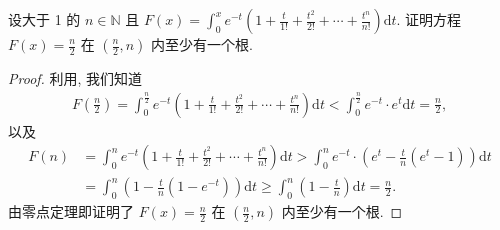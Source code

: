 \documentclass[../../main.tex]{subfiles}%
\begin{document}
\begin{example}
设大于 1 的 $n \in \mathbb{N}$ 且 $F(x) = \int_0^x e^{-t}\left(1 + \frac{t}{1!} + \frac{t^2}{2!} + \cdots + \frac{t^n}{n!}\right)\mathrm{d}t$. 证明方程 $F(x) = \frac{n}{2}$ 在 $\left(\frac{n}{2}, n\right)$ 内至少有一个根.
\end{example}
\begin{proof}
利用, 我们知道
\begin{align*}
F\left(\frac{n}{2}\right) = \int_0^{\frac{n}{2}} e^{-t}\left(1 + \frac{t}{1!} + \frac{t^2}{2!} + \cdots + \frac{t^n}{n!}\right)\mathrm{d}t < \int_0^{\frac{n}{2}} e^{-t} \cdot e^t \mathrm{d}t = \frac{n}{2},
\end{align*}
以及
\begin{align*}
F(n)&=\int_0^n{e^{-t}\left( 1+\frac{t}{1!}+\frac{t^2}{2!}+\cdots +\frac{t^n}{n!} \right) \mathrm{d}t}>\int_0^n{e^{-t}}\cdot \left( e^t-\frac{t}{n}\left( e^t-1 \right) \right) \mathrm{d}t
\\
&=\int_0^n{\left( 1-\frac{t}{n}\left( 1-e^{-t} \right) \right) \mathrm{d}t}\geqslant \int_0^n{\left( 1-\frac{t}{n} \right) \mathrm{d}t}=\frac{n}{2}.
\end{align*}
由零点定理即证明了 $F(x) = \frac{n}{2}$ 在 $\left(\frac{n}{2}, n\right)$ 内至少有一个根.
\end{proof}
\end{document}
